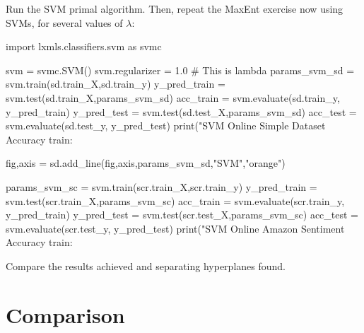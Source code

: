 
\begin{exercise}
Run the SVM primal algorithm. Then, repeat the MaxEnt exercise now using SVMs,
for several values of $\lambda$: 
\begin{python}
import lxmls.classifiers.svm as svmc

svm = svmc.SVM()
svm.regularizer = 1.0 # This is lambda
params_svm_sd = svm.train(sd.train_X,sd.train_y)
y_pred_train = svm.test(sd.train_X,params_svm_sd)
acc_train = svm.evaluate(sd.train_y, y_pred_train)
y_pred_test = svm.test(sd.test_X,params_svm_sd)
acc_test = svm.evaluate(sd.test_y, y_pred_test)
print("SVM Online Simple Dataset Accuracy train: %

fig,axis = sd.add_line(fig,axis,params_svm_sd,"SVM","orange")

params_svm_sc = svm.train(scr.train_X,scr.train_y)
y_pred_train = svm.test(scr.train_X,params_svm_sc)
acc_train = svm.evaluate(scr.train_y, y_pred_train)
y_pred_test = svm.test(scr.test_X,params_svm_sc)
acc_test = svm.evaluate(scr.test_y, y_pred_test)
print("SVM Online Amazon Sentiment Accuracy train: %
\end{python}
  
Compare the
results achieved and separating hyperplanes found.
\end{exercise}




\section{Comparison}

